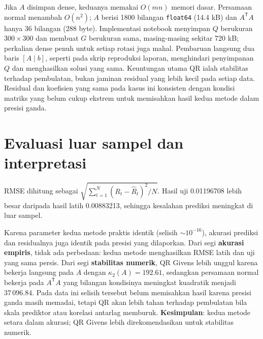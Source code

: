 \documentclass[11pt,a4paper]{article}
\begin{document}
Jika $A$ disimpan dense, keduanya memakai $O(mn)$ memori dasar. Persamaan normal menambah $O(n^2)$; $A$ berisi 1800 bilangan \texttt{float64} (14.4 kB) dan $A^\mathsf{T}A$ hanya 36 bilangan (288 byte). Implementasi notebook menyimpan $Q$ berukuran $300\times300$ dan membuat $G$ berukuran sama, masing-masing sekitar 720 kB; perkalian dense penuh untuk setiap rotasi juga mahal. Pembaruan langsung dua baris $[A\mid b]$, seperti pada skrip reproduksi laporan, menghindari penyimpanan $Q$ dan menghasilkan solusi yang sama. Keuntungan utama QR ialah stabilitas terhadap pembulatan, bukan jaminan residual yang lebih kecil pada setiap data. Residual dan koefisien yang sama pada kasus ini konsisten dengan kondisi matriks yang belum cukup ekstrem untuk memisahkan hasil kedua metode dalam presisi ganda.

\section{Evaluasi luar sampel dan interpretasi}
RMSE dihitung sebagai $\sqrt{\sum_{t=1}^{N}(R_t-\widehat R_t)^2/N}$. Hasil uji 0.01196708 lebih besar daripada hasil latih 0.00883213, sehingga kesalahan prediksi meningkat di luar sampel.

Karena parameter kedua metode praktis identik (selisih $\sim 10^{-16}$), akurasi prediksi dan residualnya juga identik pada presisi yang dilaporkan. Dari segi \textbf{akurasi empiris}, tidak ada perbedaan: kedua metode menghasilkan RMSE latih dan uji yang sama persis. Dari segi \textbf{stabilitas numerik}, QR Givens lebih unggul karena bekerja langsung pada $A$ dengan $\kappa_2(A)=192.61$, sedangkan persamaan normal bekerja pada $A^\mathsf{T}A$ yang bilangan kondisinya meningkat kuadratik menjadi $37\,096.84$. Pada data ini selisih tersebut belum memisahkan hasil karena presisi ganda masih memadai, tetapi QR akan lebih tahan terhadap pembulatan bila skala prediktor atau korelasi antarlag memburuk. \textbf{Kesimpulan}: kedua metode setara dalam akurasi; QR Givens lebih direkomendasikan untuk stabilitas numerik.
\end{document}
